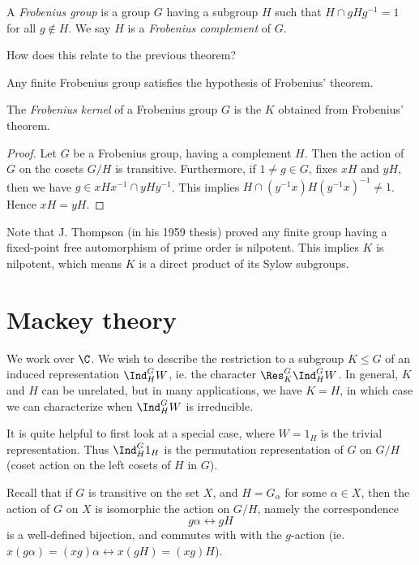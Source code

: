 \documentclass[a4paper]{article}
\begin{document}
\begin{defi}
  A \emph{Frobenius group} is a group $G$ having a subgroup $H$ such that $H\cap gHg^{-1} = 1$ for all $g \not\in H$. We say $H$ is a \emph{Frobenius complement} of $G$.
\end{defi}
How does this relate to the previous theorem?

\begin{prop}
  Any finite Frobenius group satisfies the hypothesis of Frobenius' theorem.
\end{prop}

\begin{defi}
  The \emph{Frobenius kernel} of a Frobenius group $G$ is the $K$ obtained from Frobenius' theorem.
\end{defi}

\begin{proof}
  Let $G$ be a Frobenius group, having a complement $H$. Then the action of $G$ on the cosets $G/H$ is transitive. Furthermore, if $1 \not= g\in G$, fixes $xH$ and $yH$, then we have $g \in xHx^{-1} \cap yHy^{-1}$. This implies $H \cap (y^{-1}x) H (y^{-1}x)^{-1} \not= 1$. Hence $xH = yH$.
\end{proof}

Note that J. Thompson (in his 1959 thesis) proved any finite group having a fixed-point free automorphism of prime order is nilpotent. This implies $K$ is nilpotent, which means $K$ is a direct product of its Sylow subgroups.

\section{Mackey theory}
We work over $\C$. We wish to describe the restriction to a subgroup $K\leq G$ of an induced representation $\Ind_H^G W$, ie. the character $\Res_K^G \Ind_H^G W$. In general, $K$ and $H$ can be unrelated, but in many applications, we have $K = H$, in which case we can characterize when $\Ind_H^G W$ is irreducible.

It is quite helpful to first look at a special case, where $W = 1_H$ is the trivial representation. Thus $\Ind_H^G 1_H$ is the permutation representation of $G$ on $G/H$ (coset action on the left cosets of $H$ in $G$).

Recall that if $G$ is transitive on the set $X$, and $H = G_\alpha$ for some $\alpha \in X$, then the action of $G$ on $X$ is isomorphic the action on $G/H$, namely the correspondence
\[
  g\alpha \leftrightarrow gH
\]
is a well-defined bijection, and commutes with with the $g$-action (ie. $x (g\alpha) = (xg)\alpha \leftrightarrow x(gH) = (xg)H$).
\end{document}
